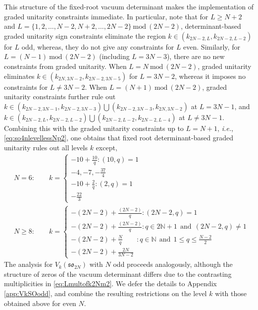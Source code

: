 This structure of the fixed-root vacuum determinant makes the implementation of graded unitarity constraints immediate. In particular, note that for $L \geqslant N+2$ and $L = \{1,2,\ldots, N-2, N+2, \ldots, 2N-2\}~\text{mod}~(2N-2)$, determinant-based graded unitarity sign constraints eliminate the region $k \in (k_{2N-2, L}, k_{2N-2, L-2})$ for $L$ odd, whereas, they do not give any constraints for $L$ even. Similarly, for $L = (N-1)~\text{mod}~(2N-2)$ (including $L = 3N-3$), there are no new constraints from graded unitarity. When $L = N~\text{mod}~(2N-2)$, graded unitarity eliminates $k \in (k_{2N, 3N-2}, k_{2N-2, 3N-5})$ for $L = 3N-2$, whereas it imposes no constraints for $L \neq 3N-2$. When $L = (N+1)~\text{mod}~(2N-2)$, graded unitarity constraints further rule out $k \in (k_{2N-2, 3N-1}, k_{2N-2, 3N-3}) \bigcup (k_{2N-2, 3N-3}, k_{2N, 3N-2})$ at $L = 3N-1$, and $k \in (k_{2N-2, L}, k_{2N-2, L-2}) \bigcup (k_{2N-2, L-2}, k_{2N-2, L-4})$ at $L \neq 3N-1$. Combining this with the graded unitarity constraints up to $L = N+1$, \emph{i.e.}, \eqref{eq:so4nlevellessNp2}, one obtains that fixed root determinant-based graded unitarity rules out all levels $k$ except,
\begin{equation} \label{eq:VkSOevengrunitresults}
\begin{split}
    &N = 6: \qquad k = \begin{cases}
        -10 + \frac{10}{q}: (10,q) = 1 \\ 
        -4, -7, -\frac{37}{4} \\
        -10 + \frac{2}{q}:  (2,q) = 1 \\
        -\frac{22}{3}
    \end{cases} \\
    &N \geqslant 8: \qquad k = \begin{cases}
        -(2N-2) + \frac{(2N-2)}{q}: (2N-2, q) = 1 \\
        -(2N-2) + \frac{(2N-2)}{q}: q \in 2\mathbb{N}+1 \ \ \text{and} \ \ (2N-2, q) \neq 1 \\
        -(2N-2) + \frac{N}{q} \qquad : q \in \mathbb{N} \ \ \text{and} \ \ 1 \leqslant q \leqslant \frac{N-2}{2} \\
        -(2N-2) + \frac{2N}{3N-2}
    \end{cases}
\end{split}
\end{equation}
The analysis for $V_k(\mathfrak{so}_{2N})$ with $N$ odd proceeds analogously, although the structure of zeros of the vacuum determinant differs due to the contrasting multiplicities in \eqref{eq:Lmultofk2Nm2}. We defer the details to Appendix \ref{app:VkSOodd}, and combine the resulting restrictions on the level $k$ with those obtained above for even $N$.


